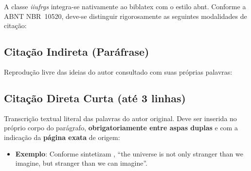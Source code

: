 \documentclass[ppgc,mestrado,biblatex]{iiufrgs}
\begin{document}
A classe \emph{iiufrgs} integra-se nativamente ao \textsf{biblatex} com o estilo \textsf{abnt}. Conforme a ABNT NBR~10520, deve-se distinguir rigorosamente as seguintes modalidades de citação:

\subsection{Citação Indireta (Paráfrase)}
Reprodução livre das ideias do autor consultado com suas próprias palavras:

\subsection{Citação Direta Curta (até 3 linhas)}
Transcrição textual literal das palavras do autor original. Deve ser inserida no próprio corpo do parágrafo, \textbf{obrigatoriamente entre aspas duplas} e com a indicação da \textbf{página exata} de origem:
\begin{itemize}
    \item \textbf{Exemplo}: Conforme sintetizam \textcite[p.~15]{Adams2009Conceptual}, ``\foreignlanguage{english}{the universe is not only stranger than we imagine, but stranger than we can imagine}''.
\end{itemize}
\end{document}
